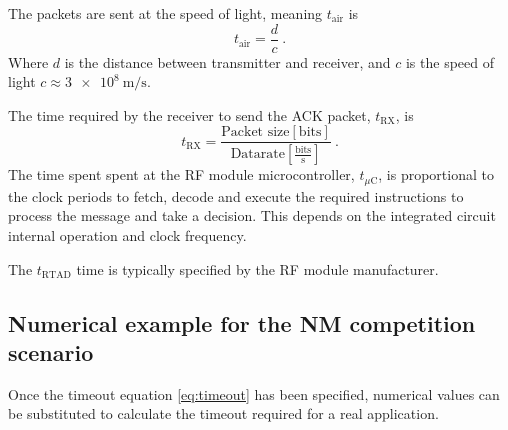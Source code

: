 The packets are sent at the speed of light, meaning $t_{\text{air}}$ is
\begin{equation}
	t_{\text{air}} = \frac{d}{c} \ .
\end{equation}
Where $d$ is the distance between transmitter and receiver, and $c$ is the speed of light $c \approx \SI{3e8}{\m\per\s}$.

The time required by the receiver to send the ACK packet, $t_{\text{RX}}$, is 
\begin{equation}
	t_{\text{RX}} = \frac{\text{Packet size} \left[\text{bits} \right]}{ \text{Datarate} \left[\frac{\text{bits}}{\text{s}} \right]}  \ .
\end{equation}
The time spent spent at the RF module microcontroller, $t_{\mu \text{C}}$, is proportional to the clock periods to fetch, decode and execute the required instructions to process the message and take a decision. This depends on the integrated circuit internal operation and clock frequency.

The $t_{\text{RTAD}}$ time is typically specified by the RF module manufacturer.



\subsection{Numerical example for the NM competition scenario}
Once the timeout equation \eqref{eq:timeout} has been specified, numerical values can be substituted to calculate the timeout required for a real application.

